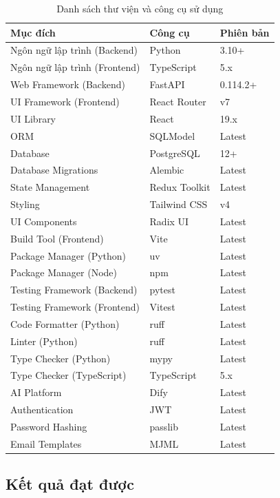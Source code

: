\documentclass[../DoAn.tex]{subfiles}
\begin{document}
\begin{table}[H]
\centering
\begin{tabular}{lll}
\hline
\textbf{Mục đích} & \textbf{Công cụ} & \textbf{Phiên bản} \\ \hline
Ngôn ngữ lập trình (Backend) & Python & 3.10+ \\
Ngôn ngữ lập trình (Frontend) & TypeScript & 5.x \\
Web Framework (Backend) & FastAPI & 0.114.2+ \\
UI Framework (Frontend) & React Router & v7 \\
UI Library & React & 19.x \\
ORM & SQLModel & Latest \\
Database & PostgreSQL & 12+ \\
Database Migrations & Alembic & Latest \\
State Management & Redux Toolkit & Latest \\
Styling & Tailwind CSS & v4 \\
UI Components & Radix UI & Latest \\
Build Tool (Frontend) & Vite & Latest \\
Package Manager (Python) & uv & Latest \\
Package Manager (Node) & npm & Latest \\
Testing Framework (Backend) & pytest & Latest \\
Testing Framework (Frontend) & Vitest & Latest \\
Code Formatter (Python) & ruff & Latest \\
Linter (Python) & ruff & Latest \\
Type Checker (Python) & mypy & Latest \\
Type Checker (TypeScript) & TypeScript & 5.x \\
AI Platform & Dify & Latest \\
Authentication & JWT & Latest \\
Password Hashing & passlib & Latest \\
Email Templates & MJML & Latest \\ \hline
\end{tabular}
\caption{Danh sách thư viện và công cụ sử dụng}
\label{table:tools}
\end{table}

\subsection{Kết quả đạt được}
\label{subsection:4.3.2}
\end{document}
